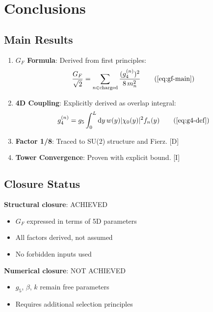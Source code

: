 \documentclass[11pt,a4paper]{article}
\newcommand{\dd}{\mathrm{d}}
\begin{document}
\section{Conclusions}
\label{sec:conclusions}

\subsection{Main Results}

\begin{enumerate}
\item \textbf{$G_F$ Formula}: Derived from first principles:
\begin{equation}
\frac{G_F}{\sqrt{2}} = \sum_{n \in \text{charged}} \frac{(g_4^{(n)})^2}{8\, m_n^2}
\tag{\ref{eq:gf-main}}
\end{equation}

\item \textbf{4D Coupling}: Explicitly derived as overlap integral:
\begin{equation}
g_4^{(n)} = g_5 \int_0^L \dd y\, w(y) |\chi_0(y)|^2 f_n(y)
\tag{\ref{eq:g4-def}}
\end{equation}

\item \textbf{Factor 1/8}: Traced to SU(2) structure and Fierz. [D]

\item \textbf{Tower Convergence}: Proven with explicit bound. [I]
\end{enumerate}

\subsection{Closure Status}

\textbf{Structural closure}: ACHIEVED
\begin{itemize}
\item $G_F$ expressed in terms of 5D parameters
\item All factors derived, not assumed
\item No forbidden inputs used
\end{itemize}

\textbf{Numerical closure}: NOT ACHIEVED
\begin{itemize}
\item $g_5$, $\beta$, $k$ remain free parameters
\item Requires additional selection principles
\end{itemize}
\end{document}
